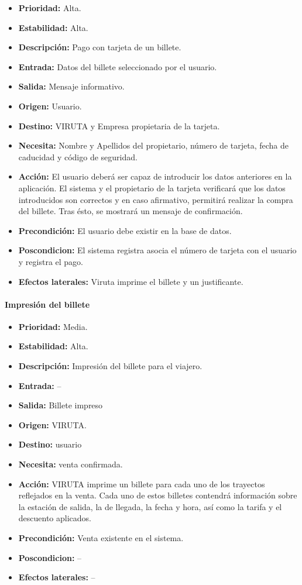 \begin{itemize}
\item \textbf{Prioridad:} Alta.
\item \textbf{Estabilidad:} Alta.
\item \textbf{Descripción:} Pago con tarjeta de un billete.
\item \textbf{Entrada:} Datos del billete seleccionado por el usuario.
\item \textbf{Salida:} Mensaje informativo.
\item \textbf{Origen:} Usuario.
\item \textbf{Destino:} VIRUTA y Empresa propietaria de la tarjeta.
\item \textbf{Necesita:} Nombre y Apellidos del propietario, número de tarjeta, fecha de caducidad y código de seguridad.
\item \textbf{Acción:} El usuario deberá ser capaz de introducir los datos anteriores en la aplicación. El sistema y el propietario de la tarjeta verificará que los datos introducidos son correctos y en caso afirmativo, permitirá realizar la compra del billete. Tras ésto, se mostrará un mensaje de confirmación.
\item \textbf{Precondición:} El usuario debe existir en la base de datos.
\item \textbf{Poscondicion:} El sistema registra asocia el número de tarjeta con el usuario y registra el pago.
\item \textbf{Efectos laterales:} Viruta imprime el billete y un justificante.
\end{itemize}

\paragraph{Impresión del billete}

\begin{itemize}
\item \textbf{Prioridad:} Media.
\item \textbf{Estabilidad:} Alta.
\item \textbf{Descripción:} Impresión del billete para el viajero.
\item \textbf{Entrada:} --
\item \textbf{Salida:} Billete impreso
\item \textbf{Origen:} VIRUTA.
\item \textbf{Destino:} usuario
\item \textbf{Necesita:} venta confirmada.
\item \textbf{Acción:} VIRUTA imprime un billete para cada uno de los trayectos reflejados en la venta. Cada uno de estos billetes contendrá información sobre la estación de salida, la de llegada, la fecha y hora, así como la tarifa y el descuento aplicados.
\item \textbf{Precondición:} Venta existente en el sistema.
\item \textbf{Poscondicion:} --
\item \textbf{Efectos laterales:} --
\end{itemize}


